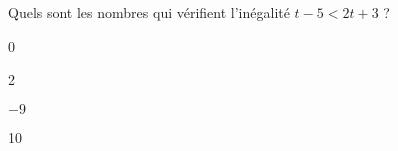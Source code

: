\begin{QCM}
\begin{GroupeQCM}
    
    \begin{exercice}
      Quels sont les nombres qui vérifient l'inégalité $t - 5 < 2t + 3$ ?
      \begin{ChoixQCM}{4}
      \item 0
      \item 2
      \item $- 9$
      \item 10
      \end{ChoixQCM}
\begin{corrige}
   \end{corrige}
    \end{exercice}


\end{GroupeQCM}
\end{QCM}

  